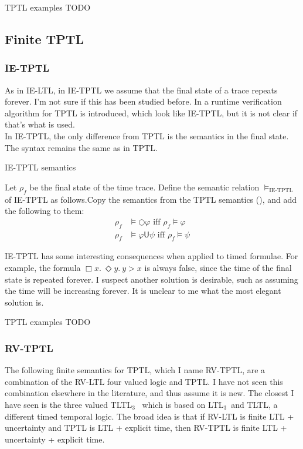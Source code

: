 \documentclass[a4paper]{article}
\newcommand{\U}{\mathsf{U}}
\newcommand{\tiff}{\text{ iff }}
\newcommand{\ltlt}{LTL$_3$}
\begin{document}
\begin{eg}{TPTL examples}
  TODO
\end{eg}

\subsection{Finite TPTL}

\subsubsection{IE-TPTL} As in IE-LTL, in IE-TPTL we assume that the final state of a trace repeats forever.  I'm not sure if this has been studied before. In \textcite{chai2013rewriting} a runtime verification algorithm for TPTL is introduced, which look like IE-TPTL, but it is not clear if that's what is used.\\
In IE-TPTL, the only difference from TPTL is the semantics in the final state. The syntax remains the same as in TPTL.

\begin{defn}{IE-TPTL semantics}

  Let $\rho_f$ be the final state of the time trace. Define the semantic relation $\vDash_{\text{IE-TPTL}}$ of IE-TPTL as follows.Copy the semantics from the TPTL semantics (), and add the following to them:
  \begin{align*}
    \rho_f &\vDash \bigcirc \varphi \tiff \rho_f \vDash \varphi\\
    \rho_f &\vDash \varphi \U \psi \tiff \rho_f \vDash \psi
  \end{align*}
\end{defn}

\begin{remk}
IE-TPTL has some interesting consequences when applied to timed formulae. For example, the formula $\Box x.~ \Diamond y.~ y > x$ is always false, since the time of the final state is repeated forever. I suspect another solution is desirable, such as assuming the time will be increasing forever. It is unclear to me what the most elegant solution is.
\end{remk}

\begin{eg}{TPTL examples}
  TODO
\end{eg}

\subsubsection{RV-TPTL} The following finite semantics for TPTL, which I name RV-TPTL, are a combination of the RV-LTL four valued logic and TPTL. I have not seen this combination elsewhere in the literature, and thus assume it is new. The closest I have seen is the three valued TLTL$_3$~\autocite[6]{arafat2005runtime} which is based on \ltlt\ and TLTL, a different timed temporal logic. The broad idea is that if RV-LTL is finite LTL + uncertainty and TPTL is LTL + explicit time, then RV-TPTL is finite LTL + uncertainty + explicit time.
\end{document}
